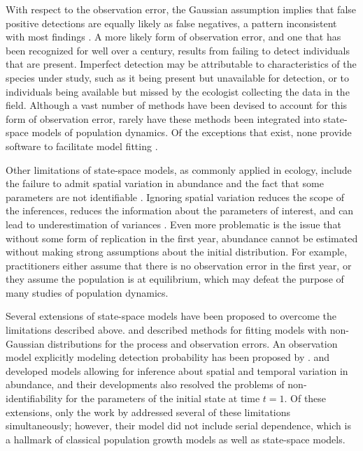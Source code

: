 \documentclass[12pt,english]{article}
\begin{document}
\begin{spacing}{1.9}
\begin{flushleft}
With respect to the observation error, the Gaussian assumption
implies that false positive detections are
equally likely as false negatives, a pattern inconsistent with most
findings \citep{miller_etal:2011}. 
A more likely form of observation error, and one that has been recognized for well
over a century, results from failing to detect individuals that are
present. Imperfect detection may be attributable to
characteristics of the species under study, such as it being present but unavailable for detection,
or to individuals being available but missed by the ecologist collecting the data in the field.
Although a vast number of methods have been devised to account for 
this form of observation error, rarely have these methods been
integrated into state-space models of population dynamics. 
Of the exceptions that exist, none provide software to facilitate model fitting 
\citep{buckland_etal:2004}.

Other limitations of state-space models, as commonly applied in ecology,
include the failure to admit spatial variation in abundance and
the fact that some parameters are not identifiable
\citep{polansky_etal:2009}. 
Ignoring spatial variation reduces the scope of the
inferences, reduces the information about the parameters of interest,
and can lead to underestimation of variances \citep{dennis_etal:2010}.
Even more problematic is the issue that without some form of replication in the first year, 
abundance cannot be estimated without making strong assumptions about 
the initial distribution. 
For example, practitioners either assume that there is no
observation error in the first year, or they assume the population is
at equilibrium, which may defeat the purpose of many studies of
population dynamics. 

Several extensions of state-space models have been proposed to
overcome the limitations described above. \citet{devalpine_hastings:2002} and
\citet{brooks_etal:2004} described methods for fitting models with non-Gaussian
distributions for the process and observation errors. An observation model 
explicitly modeling
detection probability has been proposed by 
\citet{kery_etal:2009}. \citet{lele_etal:1998} and 
\citet{kery_etal:2009} developed models allowing for inference about
spatial and temporal variation in abundance, and their developments
also resolved the problems of non-identifiability for the parameters
of the initial state at time $t=1$. Of these extensions, only
the work by \citet{kery_etal:2009} addressed several of these limitations
simultaneously; however, their model did not include serial
dependence, which is a hallmark of classical population growth models as well as state-space models. 


\end{flushleft}
\end{spacing}
\end{document}
